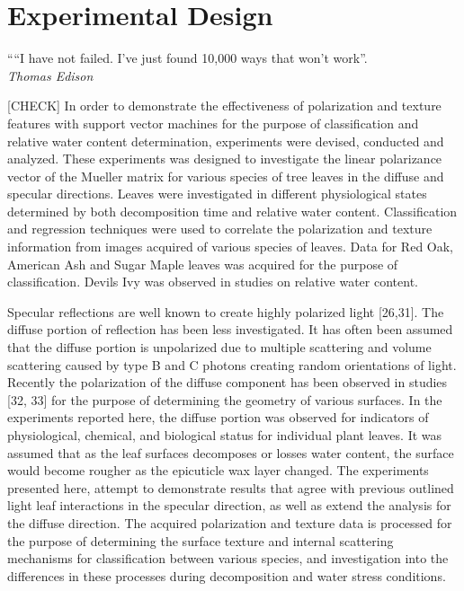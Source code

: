 \chapter{Experimental Design}
\begin{center}
  \begin{minipage}{0.75\textwidth}
    \begin{small}
      ““I have not failed. I've just found 10,000 ways that won't work”.\\
      \null\hfill\emph{Thomas Edison}
    \end{small}
  \end{minipage}
  \vspace{0.5cm}
\end{center}

[CHECK] In order to demonstrate the effectiveness of polarization and texture features with support vector machines for the purpose of classification and relative water content determination, experiments were devised, conducted and analyzed. These experiments was designed to investigate the linear polarizance vector of the Mueller matrix for various species of tree leaves in the diffuse and specular directions.  Leaves were investigated in different physiological states determined by both decomposition time and relative water content.  Classification and regression techniques were used to correlate the polarization and texture information from images acquired of various species of leaves.  Data for Red Oak, American Ash and Sugar Maple leaves was acquired for the purpose of classification.  Devils Ivy was observed in studies on relative water content.  

Specular reflections are well known to create highly polarized light [26,31]. The diffuse portion of reflection has been less investigated.  It has often been assumed that the diffuse portion is unpolarized due to multiple scattering and volume scattering caused by type B and C photons creating random orientations of light.  Recently the polarization of the diffuse component has been observed in studies [32, 33] for the purpose of determining the geometry of various surfaces.  In the experiments reported here, the diffuse portion was observed for indicators of physiological, chemical, and biological status for individual plant leaves. It was assumed that as the leaf surfaces decomposes or losses water content, the surface would become rougher as the epicuticle wax layer changed. The experiments presented here, attempt to demonstrate results that agree with previous outlined light leaf interactions in the specular direction, as well as extend the analysis for the diffuse direction.  The acquired polarization and texture data is processed for the purpose of determining the surface texture and internal scattering mechanisms for classification between various species, and investigation into the differences in these processes during decomposition and water stress conditions.

